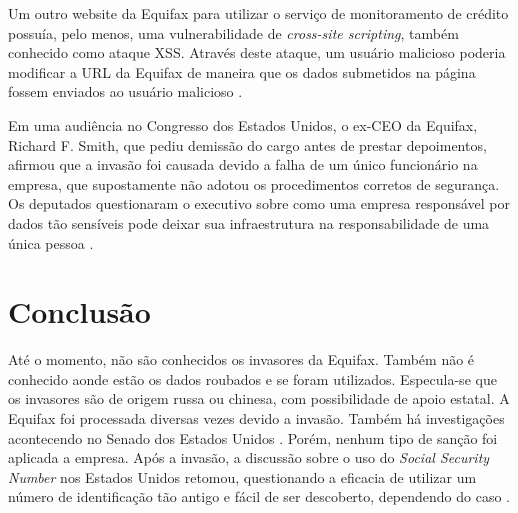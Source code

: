 \documentclass[conference]{IEEEtran}
\begin{document}
Um outro website da Equifax para utilizar o serviço de monitoramento de crédito possuía, pelo menos, uma vulnerabilidade de \textit{cross-site scripting}, também conhecido como ataque XSS. Através deste ataque, um
usuário malicioso poderia modificar a URL da Equifax de maneira que os dados submetidos na página fossem enviados ao usuário malicioso \cite{Whittaker2017}.

Em uma audiência no Congresso dos Estados Unidos, o ex-CEO da Equifax, Richard F. Smith, que pediu demissão do cargo antes de prestar depoimentos, afirmou que a invasão foi causada devido a falha de um único funcionário na empresa, que
supostamente não adotou os procedimentos corretos de segurança. Os deputados questionaram o executivo sobre como uma empresa responsável por dados tão sensíveis pode deixar sua infraestrutura na responsabilidade de uma
única pessoa \cite{Cowley2017}.

\section{Conclusão}
Até o momento, não são conhecidos os invasores da Equifax. Também não é conhecido aonde estão os dados roubados e se foram utilizados. Especula-se que os invasores são de origem russa ou chinesa, com possibilidade de apoio estatal.
A Equifax foi processada diversas vezes devido a invasão. Também há investigações acontecendo no Senado dos Estados Unidos \cite{Schroeder2018} \cite{Darrow2017} \cite{Dungan2018}. Porém, nenhum tipo de sanção foi aplicada a empresa. Após a invasão, a discussão sobre o uso do 
\textit{Social Security Number} nos Estados Unidos retomou, questionando a eficacia de utilizar um número de identificação tão antigo e fácil de ser descoberto, dependendo do caso \cite{Syeed2017}.



\end{document}
